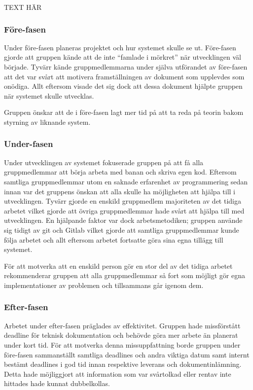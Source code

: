 \documentclass[10pt,oneside,swedish]{lips}
\begin{document}
TEXT HÄR

\subsubsection{Före-fasen}

Under före-fasen planeras projektet och hur systemet skulle se ut. Före-fasen
gjorde att gruppen kände att de inte ``famlade i mörkret'' när utvecklingen väl
började. Tyvärr kände gruppmedlemmarna under själva utförandet av före-fasen att
det var svårt att motivera framställningen av dokument som upplevdes som
onödiga. Allt eftersom visade det sig dock att dessa dokument hjälpte gruppen
när systemet skulle utvecklas.

Gruppen önskar att de i före-fasen lagt mer tid på att ta reda på teorin bakom
styrning av liknande system.

\subsubsection{Under-fasen}

Under utvecklingen av systemet fokuserade gruppen på att få alla gruppmedlemmar
att börja arbeta med banan och skriva egen kod. Eftersom samtliga gruppmedlemmar
utom en saknade erfarenhet av programmering sedan innan var det gruppens önskan
att alla skulle ha möjligheten att hjälpa till i utvecklingen. Tyvärr gjorde en
enskild gruppmedlem majoriteten av det tidiga arbetet vilket gjorde att övriga
gruppmedlemmar hade svårt att hjälpa till med utvecklingen. En hjälpande faktor
var dock arbetsmetodiken; gruppen använde sig tidigt av git och Gitlab vilket
gjorde att samtliga gruppmedlemmar kunde följa arbetet och allt eftersom arbetet
fortsatte göra sina egna tillägg till systemet.

För att motverka att en enskild person gör en stor del av det tidiga
arbetet rekommenderar gruppen att alla gruppmedlemmar så fort som möjligt gör
egna implementationer av problemen och tillsammans går igenom dem.

\subsubsection{Efter-fasen}

Arbetet under efter-fasen präglades av effektivitet. Gruppen hade missförstått
deadline för teknisk dokumentation och behövde göra mer arbete än planerat under
kort tid. För att motverka denna missuppfattning borde gruppen under
före-fasen sammanställt samtliga deadlines och andra viktiga datum samt internt
bestämt deadlines i god tid innan respektive leverans och dokumentinlämning.
Detta hade möjliggjort att information som var svårtolkad eller rentav inte
hittades hade kunnat dubbelkollas.
\end{document}

